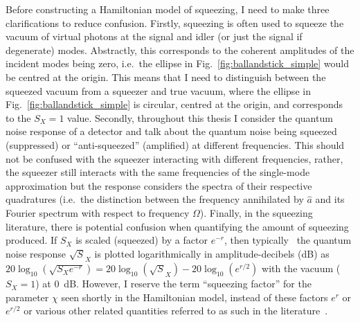 Before constructing a Hamiltonian model of squeezing, I need to make three clarifications to reduce confusion. 
Firstly, squeezing is often used to squeeze the vacuum of virtual photons at the signal and idler (or just the signal if degenerate) modes. %
Abstractly, this corresponds to the coherent amplitudes of the incident modes being zero, i.e.\ the ellipse in Fig.~\ref{fig:ballandstick_simple} would be centred at the origin. This means that I need to distinguish between the squeezed vacuum from a squeezer and true vacuum, where the ellipse in Fig.~\ref{fig:ballandstick_simple} is circular, centred at the origin, and corresponds to the $S_X=1$ value. 
Secondly, throughout this thesis I consider the quantum noise response of a detector and talk about the quantum noise being squeezed (suppressed) or ``anti-squeezed'' (amplified) at different frequencies. This should not be confused with the squeezer interacting with different frequencies, rather, the squeezer still interacts with the same frequencies of the single-mode approximation but the response considers the spectra of their respective quadratures (i.e.\ the distinction between the frequency annihilated by ${\hat a}$ and its Fourier spectrum with respect to frequency $\Omega$). Finally, in the squeezing literature, there is potential confusion when quantifying the amount of squeezing produced. If $S_X$ is scaled (squeezed) by a factor $e^{-r}$, then typically~\cite{} the quantum noise response $\sqrt S_X$ is plotted logarithmically in amplitude-decibels (dB) as $20 \log_{10}(\sqrt {S_X e^{-r}})=20 \log_{10}(\sqrt S_X) - 20\log_{10}(e^{r/2})$ with the vacuum ($S_X=1$) at $0$~dB. However, I reserve the term ``squeezing factor'' for the parameter $\chi$ seen shortly in the Hamiltonian model, instead of these factors $e^r$ or $e^{r/2}$ or various other related quantities referred to as such in the literature~\cite{}.



